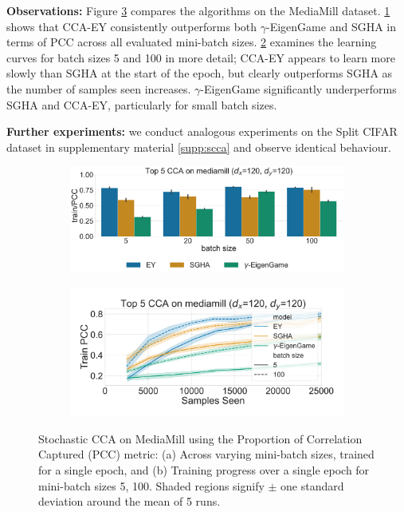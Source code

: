 \textbf{Observations:}
Figure \ref{fig:scca_mediamill} compares the algorithms on the MediaMill dataset. \cref{fig:corr_mediamill} shows that CCA-EY consistently outperforms both $\gamma$-EigenGame and SGHA in terms of PCC across all evaluated mini-batch sizes.
\cref{fig:lr_mediamill} examines the learning curves for batch sizes 5 and 100 in more detail; CCA-EY appears to learn more slowly than SGHA at the start of the epoch, but clearly outperforms SGHA as the number of samples seen increases. $\gamma$-EigenGame significantly underperforms SGHA and CCA-EY, particularly for small batch sizes.

\textbf{Further experiments:} we conduct analogous experiments on the Split CIFAR dataset in supplementary material \ref{supp:scca} and observe identical behaviour.

\begin{figure}
     \centering
     \begin{subfigure}[b]{0.49\textwidth}
         \centering
         \includegraphics[width=\textwidth]{figures/CCA/mediamill_models_different_batch_sizes}
         \caption{}
         \label{fig:corr_mediamill}
     \end{subfigure}
     \hfill
     \begin{subfigure}[b]{0.49\textwidth}
         \centering
         \includegraphics[width=\textwidth]{figures/CCA/mediamill_allbatchsizes_pcc}
         \caption{}
         \label{fig:lr_mediamill}
     \end{subfigure}
\caption{Stochastic CCA on MediaMill using the Proportion of Correlation Captured (PCC) metric: (a) Across varying mini-batch sizes, trained for a single epoch, and (b) Training progress over a single epoch for mini-batch sizes 5, 100.
Shaded regions signify \(\pm\) one standard deviation around the mean of 5 runs.}\label{fig:scca_mediamill}
\end{figure}



